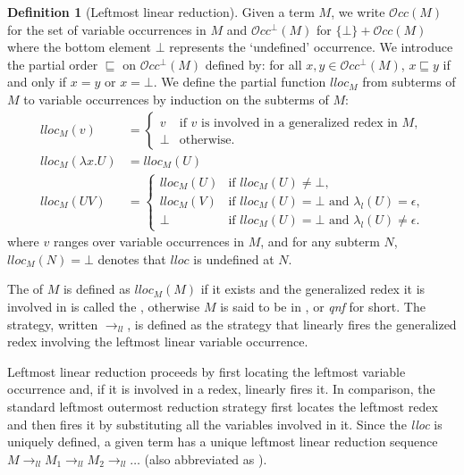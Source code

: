 \documentclass{elsarticle}
\theoremstyle{plain}
\theoremstyle{definition}
\newtheorem{definition}{Definition}[section]
\newcommand\VarOcc{\mathcal{O}{cc}}
\newcommand{\llred}{\rightarrow_{ll}}
\begin{document}
\begin{definition}[Leftmost linear reduction]
    \label{def:leftmostlinearreduction}
Given a term $M$, we write $\VarOcc(M)$ for the set of variable occurrences in $M$
and $\VarOcc^\bot(M)$ for $\{\bot \} + \VarOcc(M)$ where the bottom element $\bot$ represents the `undefined' occurrence. We introduce the partial order $\sqsubseteq$ on $\VarOcc^\bot(M)$ defined by: for all $x,y \in \VarOcc^\bot(M)$, $x \sqsubseteq y$ if and only if $x = y$ or $x = \bot$. We define the partial function $lloc_M$ from subterms of $M$ to variable occurrences by induction on the subterms of $M$:
\begin{align*}
lloc_M(v) &=
    \begin{cases}
    v &\mbox{if $v$ is involved in a generalized redex in $M$,} \\
    \bot & \mbox {otherwise.}
    \end{cases}  \\
lloc_M(\lambda x . U) &= lloc_M(U) \\
lloc_M(U V) &= \begin{cases}
                lloc_M(U) &\mbox{if $lloc_M(U)\neq\bot$,} \\
                lloc_M(V) &\mbox{if $lloc_M(U)=\bot$ and $\lambda_l(U) = \epsilon$,} \\
                \bot & \mbox{if $lloc_M(U)=\bot$ and $\lambda_l(U) \neq \epsilon$.}
              \end{cases}
\end{align*}
where $v$ ranges over variable occurrences in $M$,
and for any subterm $N$, $lloc_M(N) = \bot$ denotes that $lloc$ is undefined at $N$.

The  of $M$
is defined as $lloc_M(M)$ if it exists and the generalized redex it is involved in is called the , otherwise $M$ is said to be in , or \emph{qnf} for short.
The  strategy, written $\llred$, is defined as the strategy that linearly fires the generalized redex involving the leftmost linear variable occurrence.
\end{definition}
Leftmost linear reduction proceeds by first locating the leftmost variable occurrence and, if it is involved in a redex, linearly fires it. In comparison, the standard leftmost outermost reduction strategy first locates the leftmost redex and then fires it by substituting all the variables involved in it.
%
Since the \emph{lloc} is uniquely defined, a given term has a unique leftmost linear reduction sequence $M \llred M_1 \llred M_2 \llred \ldots$ (also abbreviated as ).
\end{document}
